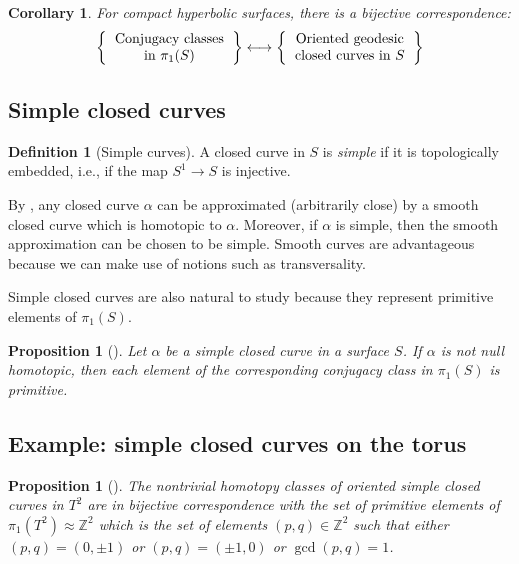 \documentclass[reqno]{amsart}
\newtheorem{proposition}[theorem]{Proposition}
\newtheorem{corollary}[theorem]{Corollary}
\theoremstyle{definition}
\newtheorem{definition}[theorem]{Definition}
\theoremstyle{remark}
\begin{document}
 \begin{corollary}
     For compact hyperbolic surfaces, 
     there is a bijective correspondence:
\[
\left\{ 
    \begin{tabular}{c}
        Conjugacy classes\\
        in $\pi_1 (S)$
\end{tabular}
\right\} 
\longleftrightarrow
\left\{ 
    \begin{tabular}{c}
        Oriented geodesic\\
        closed curves in $S$
\end{tabular}
\right\} 
\] 
 \end{corollary}

 \subsection*{Simple closed curves}
 
\begin{definition}[Simple curves]
    A closed curve in $S$ is \textit{simple} if it is topologically embedded, i.e.,
    if the map $S^{1} \to S$ is injective.  
\end{definition}

By \cite[Thm~11.8]{Bredon}, any closed curve $\alpha$ can be approximated 
(arbitrarily close) by
a smooth closed curve which is homotopic to $\alpha$. Moreover,
if $\alpha$ is simple, then the smooth approximation can be chosen to be
simple. Smooth curves are advantageous because we can make use of notions
such as transversality.

Simple closed curves are also natural to study because they represent
primitive elements of $\pi_1 (S)$.

\begin{proposition}[]
    Let $\alpha$ be a simple closed curve in a surface $S$. If $\alpha$ 
    is not null homotopic, then each element of the corresponding conjugacy
    class in $\pi_1(S)$ is primitive.
\end{proposition}

\subsection*{Example: simple closed curves on the torus}

\begin{proposition}[]\label{torus-primitive-elts}
    The nontrivial homotopy classes of oriented simple closed
    curves in $T^2$ are in bijective correspondence with the set of primitive
    elements of $\pi_1\left( T^2 \right) \approx \mathbb{Z}^2$ which is
    the set of elements $\left( p,q \right)  \in \mathbb{Z}^2$ such that
    either $(p,q) = (0,\pm 1)$ or  $(p,q) = (\pm 1,0)$ or
     $\gcd(p,q) = 1$.
\end{proposition}
\end{document}
